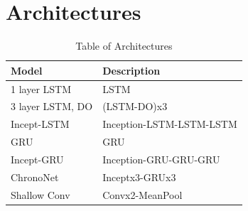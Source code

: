 \documentclass[10pt,twocolumn,letterpaper]{article}
\begin{document}
\section{Architectures}
\begin{table}[h]
  \centering
  \begin{tabular}{l|l}
    Model & Description\\
    \hline
    1 layer LSTM & LSTM\\
    3 layer LSTM, DO & (LSTM-DO)x3 \\
    Incept-LSTM & Inception-LSTM-LSTM-LSTM\\
    GRU & GRU\\
    Incept-GRU & Inception-GRU-GRU-GRU\\
    ChronoNet & Inceptx3-GRUx3\\
    Shallow Conv & Convx2-MeanPool\\    
  \end{tabular}
  \caption{Table of Architectures}
\end{table}
\end{document}
